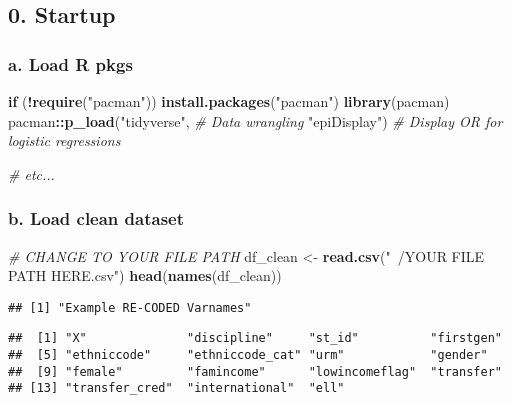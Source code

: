 \documentclass[]{article}
\newenvironment{Shaded}{\begin{snugshade}}{\end{snugshade}}
\newcommand{\KeywordTok}[1]{\textcolor[rgb]{0.13,0.29,0.53}{\textbf{#1}}}
\newcommand{\StringTok}[1]{\textcolor[rgb]{0.31,0.60,0.02}{#1}}
\newcommand{\CommentTok}[1]{\textcolor[rgb]{0.56,0.35,0.01}{\textit{#1}}}
\newcommand{\ControlFlowTok}[1]{\textcolor[rgb]{0.13,0.29,0.53}{\textbf{#1}}}
\newcommand{\OperatorTok}[1]{\textcolor[rgb]{0.81,0.36,0.00}{\textbf{#1}}}
\newcommand{\NormalTok}[1]{#1}
\begin{document}
\subsection{0. Startup}\label{startup-1}

\subsubsection{a. Load R pkgs}\label{a.-load-r-pkgs-1}

\begin{Shaded}
\begin{Highlighting}[]
\ControlFlowTok{if}\NormalTok{ (}\OperatorTok{!}\KeywordTok{require}\NormalTok{(}\StringTok{"pacman"}\NormalTok{)) }\KeywordTok{install.packages}\NormalTok{(}\StringTok{"pacman"}\NormalTok{)}
\KeywordTok{library}\NormalTok{(pacman)}
\NormalTok{pacman}\OperatorTok{::}\KeywordTok{p_load}\NormalTok{(}\StringTok{"tidyverse"}\NormalTok{,   }\CommentTok{# Data wrangling}
               \StringTok{"epiDisplay"}\NormalTok{)  }\CommentTok{# Display OR for logistic regressions}

\CommentTok{# etc...}
\end{Highlighting}
\end{Shaded}

\subsubsection{b. Load clean dataset}\label{b.-load-clean-dataset}

\begin{Shaded}
\begin{Highlighting}[]
\CommentTok{# CHANGE TO YOUR FILE PATH}
\NormalTok{df_clean <-}\StringTok{ }\KeywordTok{read.csv}\NormalTok{(}\StringTok{"~/YOUR FILE PATH HERE.csv"}\NormalTok{)}
\KeywordTok{head}\NormalTok{(}\KeywordTok{names}\NormalTok{(df_clean))}
\end{Highlighting}
\end{Shaded}

\begin{verbatim}
## [1] "Example RE-CODED Varnames"
\end{verbatim}

\begin{verbatim}
##  [1] "X"              "discipline"     "st_id"          "firstgen"      
##  [5] "ethniccode"     "ethniccode_cat" "urm"            "gender"        
##  [9] "female"         "famincome"      "lowincomeflag"  "transfer"      
## [13] "transfer_cred"  "international"  "ell"
\end{verbatim}
\end{document}
